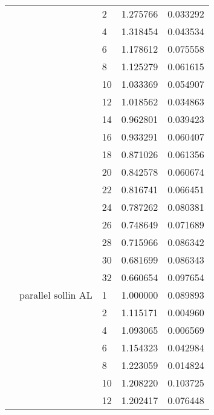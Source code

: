 \begin{tabular}{lllrr}
                      &                     & 2  &  1.275766 &  0.033292 \\
                      &                     & 4  &  1.318454 &  0.043534 \\
                      &                     & 6  &  1.178612 &  0.075558 \\
                      &                     & 8  &  1.125279 &  0.061615 \\
                      &                     & 10 &  1.033369 &  0.054907 \\
                      &                     & 12 &  1.018562 &  0.034863 \\
                      &                     & 14 &  0.962801 &  0.039423 \\
                      &                     & 16 &  0.933291 &  0.060407 \\
                      &                     & 18 &  0.871026 &  0.061356 \\
                      &                     & 20 &  0.842578 &  0.060674 \\
                      &                     & 22 &  0.816741 &  0.066451 \\
                      &                     & 24 &  0.787262 &  0.080381 \\
                      &                     & 26 &  0.748649 &  0.071689 \\
                      &                     & 28 &  0.715966 &  0.086342 \\
                      &                     & 30 &  0.681699 &  0.086343 \\
                      &                     & 32 &  0.660654 &  0.097654 \\
                      & parallel sollin AL & 1  &  1.000000 &  0.089893 \\
                      &                     & 2  &  1.115171 &  0.004960 \\
                      &                     & 4  &  1.093065 &  0.006569 \\
                      &                     & 6  &  1.154323 &  0.042984 \\
                      &                     & 8  &  1.223059 &  0.014824 \\
                      &                     & 10 &  1.208220 &  0.103725 \\
                      &                     & 12 &  1.202417 &  0.076448 \\

\end{tabular}
